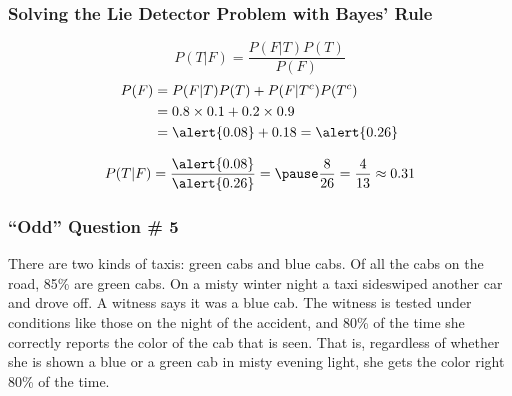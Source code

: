 \documentclass{beamer}
\begin{document}
\begin{frame}
\frametitle{Solving the Lie Detector Problem with Bayes' Rule}
\footnotesize
{}
\normalsize
$$P(T|F) = \frac{P(F|T)P(T)}{P(F)}$$ \pause
\begin{align*}
	P(F) &= P(F|T)P(T) + P(F|T^c)P(T^c)\\
		&= 0.8 \times 0.1 + 0.2\times 0.9\\ 
		&= \alert{0.08} + 0.18 = \alert{0.26} 
\end{align*}


$$P(T|F) = \frac{\alert{0.08}}{\alert{0.26}} = \pause \frac{8}{26} = \frac{4}{13} \approx 0.31$$
\end{frame}
\begin{frame}
\singlespacing
\frametitle{``Odd'' Question \# 5}


There are two kinds of taxis: green cabs and blue cabs. Of all the cabs on the road, \alert{85\% are green cabs}. On a misty winter night a taxi sideswiped another car and drove off. \alert{A witness says it was a blue cab.} The witness is tested under conditions like those on the night of the accident, and \alert{80\% of the time she correctly reports the color of the cab that is seen}. That is, regardless of whether she is shown a blue or a green cab in misty evening light, she gets the color right 80\% of the time. 

\vspace{1em}
\begin{center}
\end{center}

\end{frame}
\end{document}
